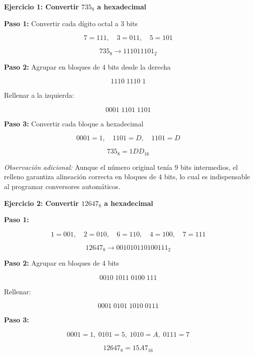 \documentclass[12pt,twoside]{book}
\begin{document}
						\noindent
						\textbf{Ejercicio 1: Convertir $735_8$ a hexadecimal}
						
						\noindent
						\textbf{Paso 1:} Convertir cada dígito octal a 3 bits
						
						\[
						7=111,\quad 3=011,\quad 5=101
						\]
						
						\[
						735_8 \rightarrow 111011101_2
						\]
						
						\noindent
						\textbf{Paso 2:} Agrupar en bloques de 4 bits desde la derecha
						
						\[
						1110\;1110\;1
						\]
						
						\noindent
						Rellenar a la izquierda:
						
						\[
						0001\;1101\;1101
						\]
						
						\noindent
						\textbf{Paso 3:} Convertir cada bloque a hexadecimal
						
						\[
						0001=1,\quad 1101=D,\quad 1101=D
						\]
						
						\[
						735_8 = 1DD_{16}
						\]
						
						\noindent
						\emph{Observación adicional:} Aunque el número original tenía 9 bits intermedios, el relleno garantiza alineación correcta en bloques de 4 bits, lo cual es indispensable al programar conversores automáticos.
						
						\bigskip
						
						\noindent
						\textbf{Ejercicio 2: Convertir $12647_8$ a hexadecimal}
						
						\noindent
						\textbf{Paso 1:}
						
						\[
						1=001,\quad 2=010,\quad 6=110,\quad 4=100,\quad 7=111
						\]
						
						\[
						12647_8 \rightarrow 001010110100111_2
						\]
						
						\noindent
						\textbf{Paso 2:} Agrupar en bloques de 4 bits
						
						\[
						0010\;1011\;0100\;111
						\]
						
						\noindent
						Rellenar:
						
						\[
						0001\;0101\;1010\;0111
						\]
						
						\noindent
						\textbf{Paso 3:}
						
						\[
						0001=1,\;0101=5,\;1010=A,\;0111=7
						\]
						
						\[
						12647_8 = 15A7_{16}
						\]
						
\end{document}
